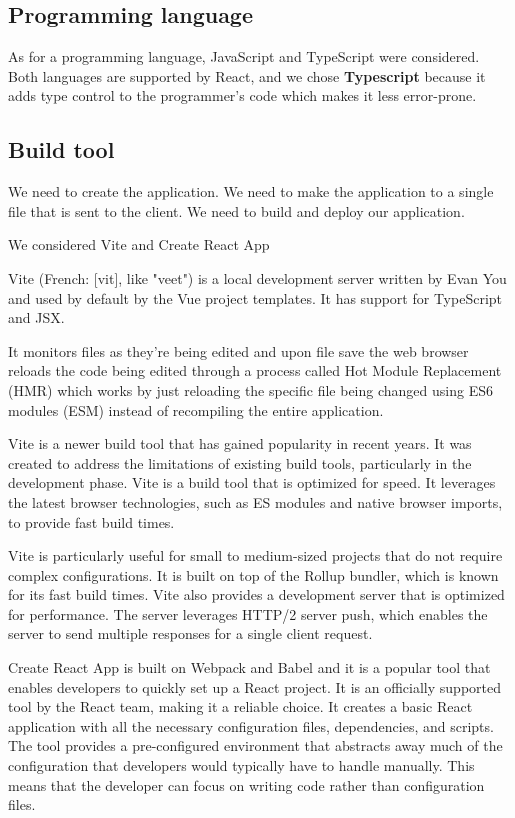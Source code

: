 \subsection*{Programming language}
As for a programming language, JavaScript and TypeScript were considered.
Both languages are supported by React, and we chose \textbf{Typescript} because it adds type control to the programmer's code which makes it less error-prone.

\subsection*{Build tool}
  We need to create the application.
  We need to make the application to a single file that is sent to the client.
  We need to build and deploy our application.

  We considered Vite and Create React App

  Vite (French: [vit], like "veet") is a local development server written by Evan You and used by default by the Vue project templates. It has support for TypeScript and JSX.

  It monitors files as they're being edited and upon file save the web browser reloads the code being edited through a process called Hot Module Replacement (HMR) which works by just reloading the specific file being changed using ES6 modules (ESM) instead of recompiling the entire application.

  Vite is a newer build tool that has gained popularity in recent years. It was created to address the limitations of existing build tools, particularly in the development phase. Vite is a build tool that is optimized for speed. It leverages the latest browser technologies, such as ES modules and native browser imports, to provide fast build times.

  Vite is particularly useful for small to medium-sized projects that do not require complex configurations. It is built on top of the Rollup bundler, which is known for its fast build times. Vite also provides a development server that is optimized for performance. The server leverages HTTP/2 server push, which enables the server to send multiple responses for a single client request.

  Create React App is built on Webpack and Babel and it is a popular tool that enables developers to quickly set up a React project. It is an officially supported tool by the React team, making it a reliable choice. It creates a basic React application with all the necessary configuration files, dependencies, and scripts. The tool provides a pre-configured environment that abstracts away much of the configuration that developers would typically have to handle manually. This means that the developer can focus on writing code rather than configuration files.

